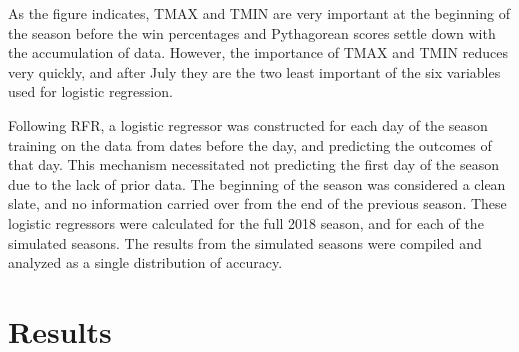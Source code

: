 \documentclass{article}
\begin{document}
As the figure indicates,
TMAX and TMIN are very important at the beginning of the season before the
win percentages and Pythagorean scores settle down with the accumulation of
data.
However,
the importance of TMAX and TMIN reduces very quickly,
and after July they are the two least important of the six variables used for 
logistic regression. \par

Following RFR,
a logistic regressor was constructed for each day of the season training on
the data from dates before the day,
and predicting the outcomes of that day.
This mechanism necessitated not predicting the first day of the season due to
the lack of prior data.
The beginning of the season was considered a clean slate,
and no information carried over from the end of the previous season.
These logistic regressors were calculated for the full 2018 season,
and for each of the simulated seasons.
The results from the simulated seasons were compiled and analyzed as a single
distribution of accuracy.

\section{Results}
\end{document}

